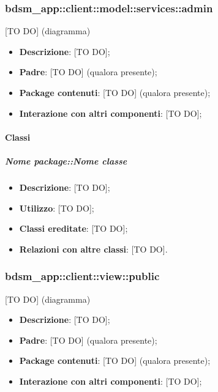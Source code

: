 	\subsubsection{bdsm\_app::client::model::services::admin} %
	\label{ssub:bdsm_app_client_model_services_admin}
	[TO DO] (diagramma) \newline \newline

	\begin{itemize}
		\item \textbf{Descrizione}: [TO DO];
		\item \textbf{Padre}: [TO DO] (qualora presente);
		\item \textbf{Package contenuti}: [TO DO] (qualora presente);
		\item \textbf{Interazione con altri componenti}: [TO DO];
	\end{itemize}

		\paragraph{Classi} %
			\subparagraph{Nome package::Nome classe} %
			\label{subp:subparagraph_name}
				\begin{itemize}
					\item \textbf{Descrizione}: [TO DO];
					\item \textbf{Utilizzo}: [TO DO];
					\item \textbf{Classi ereditate}: [TO DO];
					\item \textbf{Relazioni con altre classi}: [TO DO].
				\end{itemize}	











	\subsubsection{bdsm\_app::client::view::public} %
	\label{ssub:bdsm_app_client_view_public}
	[TO DO] (diagramma) \newline \newline

	\begin{itemize}
		\item \textbf{Descrizione}: [TO DO];
		\item \textbf{Padre}: [TO DO] (qualora presente);
		\item \textbf{Package contenuti}: [TO DO] (qualora presente);
		\item \textbf{Interazione con altri componenti}: [TO DO];
	\end{itemize}

